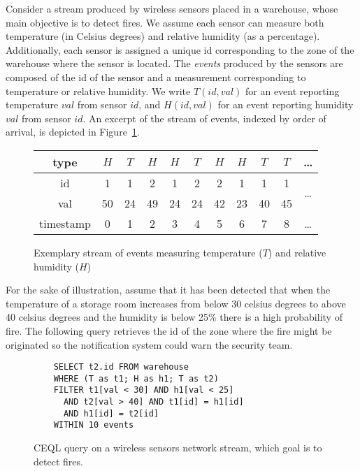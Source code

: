 \begin{example}
Consider a stream produced by wireless sensors placed in a warehouse, whose main objective is to detect fires. We assume each sensor can measure both temperature (in Celsius degrees) and relative humidity (as a percentage). Additionally, each sensor is assigned a unique id corresponding to the zone of the warehouse where the sensor is located. The \emph{events} produced by the sensors are composed of the id of the sensor and a measurement corresponding to temperature or relative humidity. We write $T(id, val)$ for an event reporting temperature $val$ from sensor $id$, and $H(id, val)$ for an event reporting humidity $val$ from sensor $id$. An excerpt of the stream of events, indexed by order of arrival, is depicted in Figure~\ref{fig:stream}.

\begin{figure}[H]
  \centering
  \begin{tabular}{|c|c|c|c|c|c|c|c|c|c|c}\hline
    type  &$H$&$T$&$H$&$H$&$T$&$H$&$H$&$T$&$T$ & \ldots \\ \hline
    id  & 1 & 1 & 2 & 1 & 2 & 2 & 1 & 1 & 1 & \multirow{2}{*}{\ldots} \\
    val & 50 & 24& 49& 24& 24& 42& 23& 40& 45\\ \hline
    timestamp & 0 & 1 & 2 & 3 & 4 & 5 & 6 & 7 & 8 & \ldots \\ \hline
  \end{tabular}
  \caption{Exemplary stream of events measuring temperature ($T$) and relative humidity ($H$)}
  \label{fig:stream}
\end{figure}

For the sake of illustration, assume that it has been detected that when the temperature of a storage room increases from below 30 celsius degrees to above 40 celsius degrees and the humidity is below 25\% there is a high probability of fire. The following query retrieves the id of the zone where the fire might be originated so the notification system could warn the security team.

\begin{figure}[h!]
  \begin{verbatim}
    SELECT t2.id FROM warehouse
    WHERE (T as t1; H as h1; T as t2)
    FILTER t1[val < 30] AND h1[val < 25]
      AND t2[val > 40] AND t1[id] = h1[id]
      AND h1[id] = t2[id]
    WITHIN 10 events
  \end{verbatim}
  \caption{CEQL query on a wireless sensors network stream, which goal is to detect fires.}
  \label{fig:query:1}
\end{figure}


\end{example}
